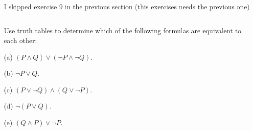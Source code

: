 \documentclass{article}
\begin{document}
\subsection{}
I skipped exercise 9 in the previous section (this exercises needs the previous one)
\subsection{}
Use truth tables to determine which of the following formulas are
equivalent to each other:

(a) $(P \land Q) \lor (\neg P \land \neg Q)$.

(b) $\neg P \lor Q$.

(c) $(P \lor \neg Q) \land (Q \lor \neg P)$.

(d) $\neg(P \lor Q)$.

(e) $(Q \land P) \lor \neg P$.
\end{document}
